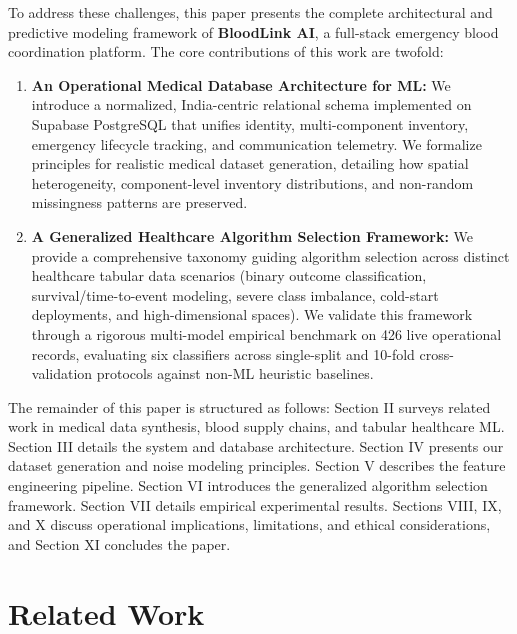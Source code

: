 \documentclass[conference]{IEEEtran}
\begin{document}
To address these challenges, this paper presents the complete architectural and predictive modeling framework of \textbf{BloodLink AI}, a full-stack emergency blood coordination platform. The core contributions of this work are twofold:
\begin{enumerate}
    \item \textbf{An Operational Medical Database Architecture for ML:} We introduce a normalized, India-centric relational schema implemented on Supabase PostgreSQL that unifies identity, multi-component inventory, emergency lifecycle tracking, and communication telemetry. We formalize principles for realistic medical dataset generation, detailing how spatial heterogeneity, component-level inventory distributions, and non-random missingness patterns are preserved.
    \item \textbf{A Generalized Healthcare Algorithm Selection Framework:} We provide a comprehensive taxonomy guiding algorithm selection across distinct healthcare tabular data scenarios (binary outcome classification, survival/time-to-event modeling, severe class imbalance, cold-start deployments, and high-dimensional spaces). We validate this framework through a rigorous multi-model empirical benchmark on 426 live operational records, evaluating six classifiers across single-split and 10-fold cross-validation protocols against non-ML heuristic baselines.
\end{enumerate}

The remainder of this paper is structured as follows: Section II surveys related work in medical data synthesis, blood supply chains, and tabular healthcare ML. Section III details the system and database architecture. Section IV presents our dataset generation and noise modeling principles. Section V describes the feature engineering pipeline. Section VI introduces the generalized algorithm selection framework. Section VII details empirical experimental results. Sections VIII, IX, and X discuss operational implications, limitations, and ethical considerations, and Section XI concludes the paper.

\section{Related Work}
\end{document}
